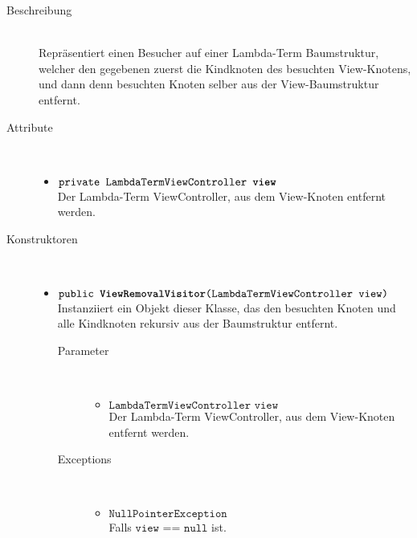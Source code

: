 \begin{description}
\item[Beschreibung] \hfill \\ Repräsentiert einen Besucher auf einer Lambda-Term Baumstruktur, welcher den gegebenen zuerst die Kindknoten des besuchten View-Knotens, und dann denn besuchten Knoten selber aus der View-Baumstruktur entfernt.

\item[Attribute] \hfill \\
	\vspace{-.8cm}
	\begin{itemize}
		\item $\texttt{private LambdaTermViewController \textbf{view}}$ \\ Der Lambda-Term ViewController, aus dem View-Knoten entfernt werden.
	\end{itemize}

\item[Konstruktoren] \hfill \\
	\vspace{-.8cm}
	\begin{itemize}
		\item $\texttt{public \textbf{ViewRemovalVisitor}(LambdaTermViewController view)}$ \\ Instanziiert ein Objekt dieser Klasse, das den besuchten Knoten und alle Kindknoten rekursiv aus der Baumstruktur entfernt.
		\begin{description}
			\item[Parameter] \hfill \\
			\vspace{-.8cm}
			\begin{itemize}
				\item $\texttt{LambdaTermViewController view}$ \\ Der Lambda-Term ViewController, aus dem View-Knoten entfernt werden.
			\end{itemize}
			\item[Exceptions] \hfill \\
			\vspace{-.8cm}
			\begin{itemize}
				\item $\texttt{NullPointerException}$ \\ Falls $\texttt{view == null}$ ist.
			\end{itemize}
		\end{description}
	\end{itemize}


\end{description}
